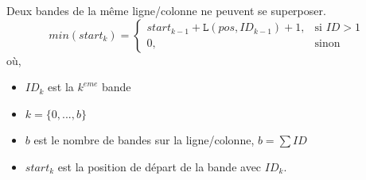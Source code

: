 \documentclass[a4paper,12pt]{report}
\begin{document}
Deux bandes de la même ligne/colonne ne peuvent se superposer.
$$ min(start_k) = 
	\begin{cases} 
		start_{k-1}+\mathtt{L}(pos,ID_{k-1})+1, &\text{si } ID > 1 \\
		0, & \text{sinon} 
	\end{cases}
$$
où,
		\begin{itemize}
		\item[] $ID_k$ est la $k^{eme}$ bande
		\item[] $k=\{0,...,b\}$
		\item[] $b$ est le nombre de bandes sur la ligne/colonne, $b=\sum ID$	
		\item[] $start_k$ est la position de départ de la bande avec $ID_k$.
		\end{itemize}

\pagebreak



%
%
%
%
%
%
%
%
\end{document}
